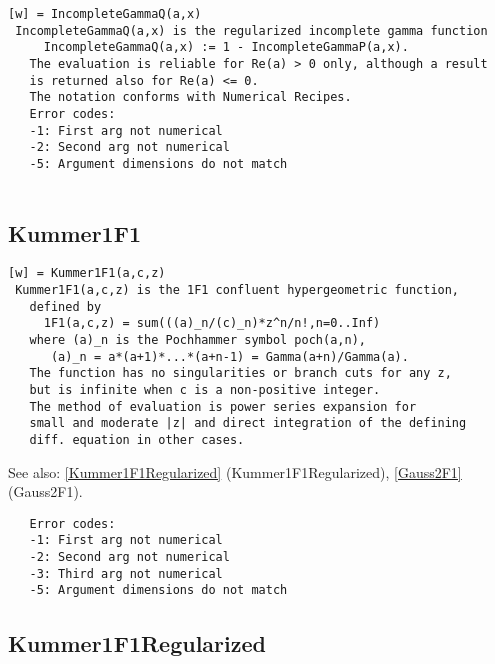 \documentclass[a4paper]{article}
\begin{document}
\begin{tscreen}
\begin{verbatim}
[w] = IncompleteGammaQ(a,x)
 IncompleteGammaQ(a,x) is the regularized incomplete gamma function
     IncompleteGammaQ(a,x) := 1 - IncompleteGammaP(a,x).
   The evaluation is reliable for Re(a) > 0 only, although a result
   is returned also for Re(a) <= 0.
   The notation conforms with Numerical Recipes.
   Error codes:
   -1: First arg not numerical
   -2: Second arg not numerical
   -5: Argument dimensions do not match
 
\end{verbatim}
\end{tscreen}



\subsection{Kummer1F1\label{Kummer1F1}}

\begin{tscreen}
\begin{verbatim}
[w] = Kummer1F1(a,c,z)
 Kummer1F1(a,c,z) is the 1F1 confluent hypergeometric function,
   defined by
     1F1(a,c,z) = sum(((a)_n/(c)_n)*z^n/n!,n=0..Inf)
   where (a)_n is the Pochhammer symbol poch(a,n),
      (a)_n = a*(a+1)*...*(a+n-1) = Gamma(a+n)/Gamma(a).
   The function has no singularities or branch cuts for any z,
   but is infinite when c is a non-positive integer.
   The method of evaluation is power series expansion for
   small and moderate |z| and direct integration of the defining
   diff. equation in other cases.
\end{verbatim}

See also: \ref{Kummer1F1Regularized} {(Kummer1F1Regularized)}, \ref{Gauss2F1} {(Gauss2F1)}.
\begin{verbatim}
   Error codes:
   -1: First arg not numerical
   -2: Second arg not numerical
   -3: Third arg not numerical
   -5: Argument dimensions do not match
\end{verbatim}
\end{tscreen}



\subsection{Kummer1F1Regularized\label{Kummer1F1Regularized}}
\end{document}
